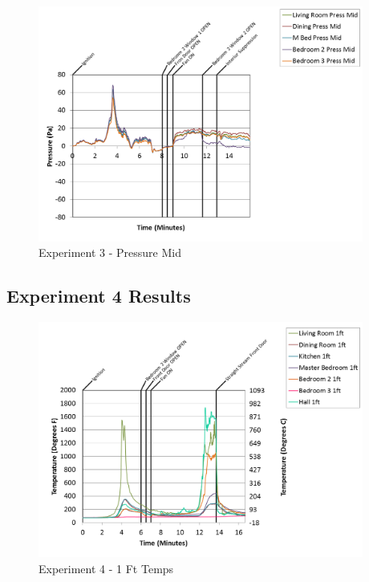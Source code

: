 \documentclass{article}
\begin{document}
\begin{appendices}
\begin{figure}[h!]
	\centering
	\includegraphics[height=3.05in]{0_Images/Results_Charts/Exp_3_Charts/PressureMid.png}
	\caption{Experiment 3 - Pressure Mid}
\end{figure}

\clearpage

\clearpage
\clearpage		\large
\subsection{Experiment 4 Results} \label{App:Exp4Results} 

\begin{figure}[h!]
	\centering
	\includegraphics[height=3.05in]{0_Images/Results_Charts/Exp_4_Charts/1FtTemps.png}
	\caption{Experiment 4 - 1 Ft Temps}
\end{figure}



\end{appendices}
\end{document}
